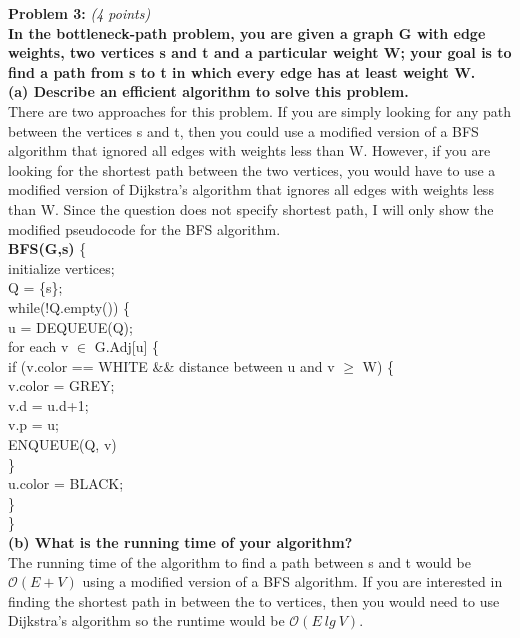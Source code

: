 \documentclass{article}
\begin{document}
\noindent \textbf{Problem 3:} \textit{(4 points)} \\

\noindent \textbf{In the bottleneck-path problem, you are given a graph G with edge weights, two vertices s and t and a particular weight W; your goal is to find a path from s to t in which every edge has at least weight W.}
\\[.25cm]

\noindent \textbf{(a) Describe an efficient algorithm to solve this problem.}
\\[.25cm]
There are two approaches for this problem. If you are simply looking for any path between the vertices s and t, then you could use a modified version of a BFS algorithm that ignored all edges with weights less than W. However, if you are looking for the shortest path between the two vertices, you would have to use a modified version of Dijkstra's algorithm that ignores all edges with weights less than W. Since the question does not specify shortest path, I will only show the modified pseudocode for the BFS algorithm.
\\[.25cm]
\textbf{BFS(G,s)} \{ \\
\indent initialize vertices;\\
\indent Q = \{s\};\\
\indent while(!Q.empty()) \{ \\
\indent\indent u = DEQUEUE(Q);\\
\indent\indent for each v $\in$ G.Adj[u] \{ \\ 
\indent\indent\indent if (v.color == WHITE \&\& distance between u and v $\geq$ W) \{ \\
\indent\indent\indent\indent v.color = GREY;\\
\indent\indent\indent\indent v.d = u.d+1;\\
\indent\indent\indent\indent v.p = u;\\
\indent\indent\indent\indent ENQUEUE(Q, v)\\
\indent\indent \} \\
\indent\indent u.color = BLACK;\\
\indent \} \\
\} \\


\textbf{(b) What is the running time of your algorithm?}
\\[.25cm]
The running time of the algorithm to find a path between s and t would be $\mathcal{O} (E + V)$ using a modified version of a BFS algorithm. If you are interested in finding the shortest path in between the to vertices, then you would need to use Dijkstra's algorithm so the runtime would be $\mathcal{O} (E\ lg \ V)$.
\\[.25cm]
\end{document}
